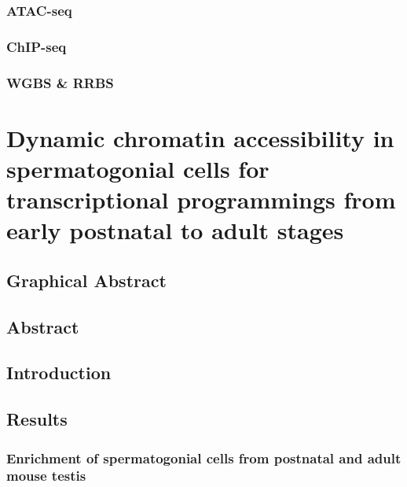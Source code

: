 \documentclass[12pt,twoside]{reedthesis}
\begin{document}
\hypertarget{atac-seq}{%
\subsection{ATAC-seq}\label{atac-seq}}

\hypertarget{chip-seq}{%
\subsection{ChIP-seq}\label{chip-seq}}

\hypertarget{wgbs-rrbs}{%
\subsection{WGBS \& RRBS}\label{wgbs-rrbs}}

\hypertarget{developmental}{%
\chapter{Dynamic chromatin accessibility in spermatogonial cells for transcriptional programmings from early postnatal to adult stages}\label{developmental}}

\newpage

\hypertarget{graphical-abstract}{%
\section{Graphical Abstract}\label{graphical-abstract}}

\newpage

\hypertarget{abstract-1}{%
\section{Abstract}\label{abstract-1}}

\newpage

\hypertarget{introduction}{%
\section{Introduction}\label{introduction}}

\newpage

\hypertarget{results}{%
\section{Results}\label{results}}

\hypertarget{enrichment-of-spermatogonial-cells-from-postnatal-and-adult-mouse-testis}{%
\subsection{Enrichment of spermatogonial cells from postnatal and adult mouse testis}\label{enrichment-of-spermatogonial-cells-from-postnatal-and-adult-mouse-testis}}
\end{document}
